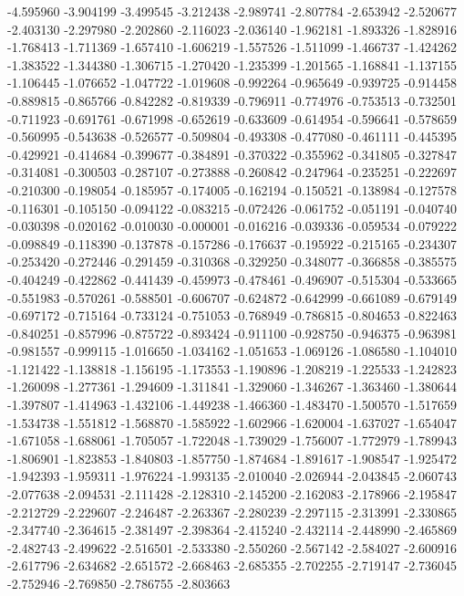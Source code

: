 -4.595960
-3.904199
-3.499545
-3.212438
-2.989741
-2.807784
-2.653942
-2.520677
-2.403130
-2.297980
-2.202860
-2.116023
-2.036140
-1.962181
-1.893326
-1.828916
-1.768413
-1.711369
-1.657410
-1.606219
-1.557526
-1.511099
-1.466737
-1.424262
-1.383522
-1.344380
-1.306715
-1.270420
-1.235399
-1.201565
-1.168841
-1.137155
-1.106445
-1.076652
-1.047722
-1.019608
-0.992264
-0.965649
-0.939725
-0.914458
-0.889815
-0.865766
-0.842282
-0.819339
-0.796911
-0.774976
-0.753513
-0.732501
-0.711923
-0.691761
-0.671998
-0.652619
-0.633609
-0.614954
-0.596641
-0.578659
-0.560995
-0.543638
-0.526577
-0.509804
-0.493308
-0.477080
-0.461111
-0.445395
-0.429921
-0.414684
-0.399677
-0.384891
-0.370322
-0.355962
-0.341805
-0.327847
-0.314081
-0.300503
-0.287107
-0.273888
-0.260842
-0.247964
-0.235251
-0.222697
-0.210300
-0.198054
-0.185957
-0.174005
-0.162194
-0.150521
-0.138984
-0.127578
-0.116301
-0.105150
-0.094122
-0.083215
-0.072426
-0.061752
-0.051191
-0.040740
-0.030398
-0.020162
-0.010030
-0.000001
-0.016216
-0.039336
-0.059534
-0.079222
-0.098849
-0.118390
-0.137878
-0.157286
-0.176637
-0.195922
-0.215165
-0.234307
-0.253420
-0.272446
-0.291459
-0.310368
-0.329250
-0.348077
-0.366858
-0.385575
-0.404249
-0.422862
-0.441439
-0.459973
-0.478461
-0.496907
-0.515304
-0.533665
-0.551983
-0.570261
-0.588501
-0.606707
-0.624872
-0.642999
-0.661089
-0.679149
-0.697172
-0.715164
-0.733124
-0.751053
-0.768949
-0.786815
-0.804653
-0.822463
-0.840251
-0.857996
-0.875722
-0.893424
-0.911100
-0.928750
-0.946375
-0.963981
-0.981557
-0.999115
-1.016650
-1.034162
-1.051653
-1.069126
-1.086580
-1.104010
-1.121422
-1.138818
-1.156195
-1.173553
-1.190896
-1.208219
-1.225533
-1.242823
-1.260098
-1.277361
-1.294609
-1.311841
-1.329060
-1.346267
-1.363460
-1.380644
-1.397807
-1.414963
-1.432106
-1.449238
-1.466360
-1.483470
-1.500570
-1.517659
-1.534738
-1.551812
-1.568870
-1.585922
-1.602966
-1.620004
-1.637027
-1.654047
-1.671058
-1.688061
-1.705057
-1.722048
-1.739029
-1.756007
-1.772979
-1.789943
-1.806901
-1.823853
-1.840803
-1.857750
-1.874684
-1.891617
-1.908547
-1.925472
-1.942393
-1.959311
-1.976224
-1.993135
-2.010040
-2.026944
-2.043845
-2.060743
-2.077638
-2.094531
-2.111428
-2.128310
-2.145200
-2.162083
-2.178966
-2.195847
-2.212729
-2.229607
-2.246487
-2.263367
-2.280239
-2.297115
-2.313991
-2.330865
-2.347740
-2.364615
-2.381497
-2.398364
-2.415240
-2.432114
-2.448990
-2.465869
-2.482743
-2.499622
-2.516501
-2.533380
-2.550260
-2.567142
-2.584027
-2.600916
-2.617796
-2.634682
-2.651572
-2.668463
-2.685355
-2.702255
-2.719147
-2.736045
-2.752946
-2.769850
-2.786755
-2.803663
